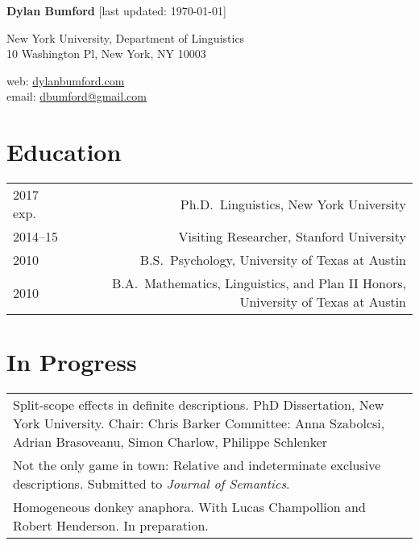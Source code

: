 \documentclass[12pt]{article}
\renewcommand{\arraystretch}{1.5} %
\begin{document}
\textbf{Dylan Bumford}\hfill
{\color{gray}[last updated: \today]}

\bigskip

\begin{minipage}[t]{0.55\textwidth}
New York University, Department of Linguistics\\
10 Washington Pl, New York, NY 10003
\end{minipage}
\begin{minipage}[t]{\linegoal}
\raggedleft%
web: \url{dylanbumford.com}\\
email: \href{mailto:dbumford@gmail.com}{dbumford@gmail.com}
\end{minipage}

\bigskip

\section*{Education}

\begingroup
\renewcommand{\arraystretch}{1} %
\begin{longtable}{LR}
  2017 exp.   & Ph.D.~Linguistics, New York University\\
  2014--15    & Visiting Researcher, Stanford University\\
  2010        & B.S.~Psychology, University of Texas at Austin\\
  2010        & B.A.~Mathematics, Linguistics, and Plan II Honors, University of
                Texas at Austin
\end{longtable}
\endgroup

\bigskip

\section*{In Progress}

\begin{longtable}{@{}p{\textwidth}@{}}
  Split-scope effects in definite descriptions. PhD Dissertation, New York
  University.\newline
  Chair: Chris Barker\newline
  Committee: Anna Szabolcsi, Adrian Brasoveanu, Simon Charlow, Philippe
  Schlenker\\
  Not the only game in town: Relative and indeterminate exclusive
  descriptions. Submitted to \textit{Journal of Semantics}.\\
  Homogeneous donkey anaphora. With Lucas Champollion and Robert Henderson. In
  preparation.
\end{longtable}
\end{document}
